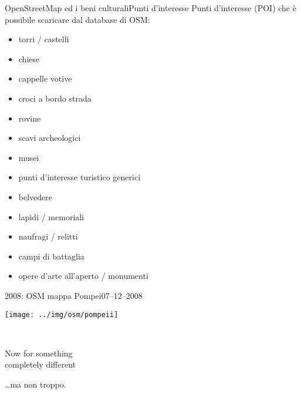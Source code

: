 \documentclass[xcolor=svgnames]{beamer}
\begin{document}

	\begin{frame}{OpenStreetMap ed i beni culturali}{Punti d'interesse}
		Punti d'interesse (POI) che è possibile scaricare dal database di OSM:
		\begin{itemize}
			\item torri / castelli
			\item chiese
			\item cappelle votive
			\item croci a bordo strada
			\item rovine
			\item scavi archeologici
			\item musei
			\item punti d'interesse turistico generici
			\item belvedere
			\item lapidi / memoriali
			\item naufragi / relitti
			\item campi di battaglia
			\item opere d'arte all'aperto / monumenti
		\end{itemize}
	\end{frame}


	\begin{frame}{2008: OSM mappa Pompei}{07--12--2008}
		\begin{center}
			\texttt{[image: ../img/osm/pompeii]}
		\end{center}
	\end{frame}


	\begin{frame}{~}
		\begin{center}
			\huge
			Now for something\\completely different
		\end{center}
		\vfill
		\begin{flushright}
			\Large \ldots ma non troppo.
		\end{flushright}
	\end{frame}

\end{document}
